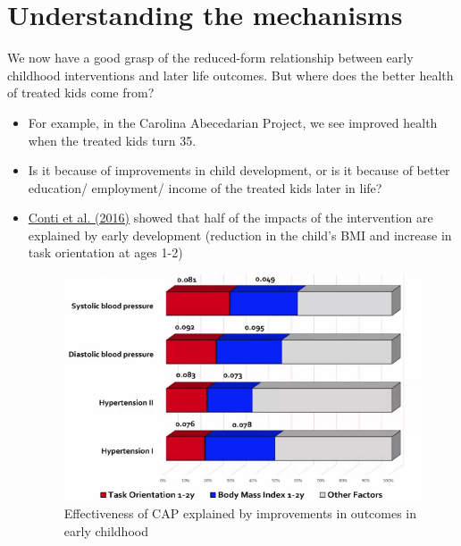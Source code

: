 \section{Understanding the mechanisms}
We now have a good grasp of the reduced-form relationship between early childhood interventions and later life outcomes. But where does the better health of treated kids come from?
\begin{itemize}
    \item For example, in the Carolina Abecedarian Project, we see improved health when the treated kids turn 35. 
    \item Is it because of improvements in child development, or is it because of better education/ employment/ income of the treated kids later in life?
    \item \href{https://academic.oup.com/ej/article-abstract/126/596/F28/5077840?redirectedFrom=fulltext&casa_token=7tYaZ_u9hhsAAAAA:JtyABJ0NboRziZ1F73fmiYNF17TKsHa48wWG_hCynCAQ491LcMOp1GRP0DPh5HmN3DI1sWawzjkHA7k}{Conti et al. (2016)} showed that half of the impacts of the intervention are explained by early development (reduction in the child’s BMI and
increase in task orientation at ages 1-2)
            \begin{figure}[H]%
    \centering
    \includegraphics[width=13cm]{images/ch4/mechansms_ABC.png}
    \caption{Effectiveness of CAP explained by improvements in outcomes in early childhood}
    \end{figure}
\end{itemize}
    


